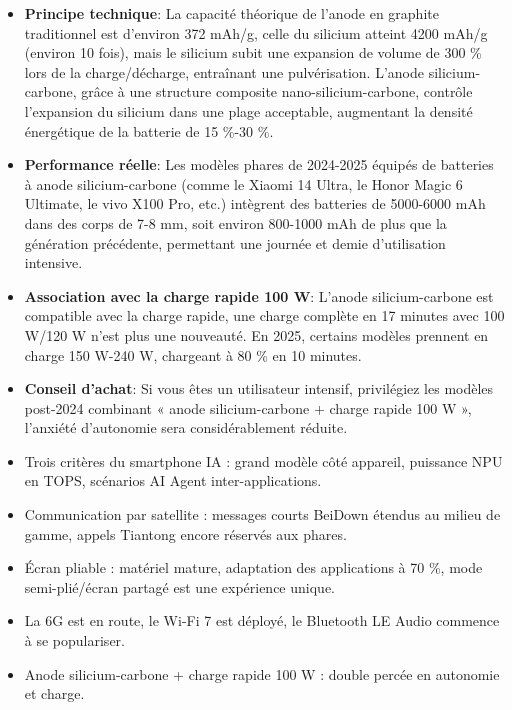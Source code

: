 \begin{itemize}
  \item \textbf{Principe technique}: La capacité théorique de l'anode en graphite traditionnel est d'environ 372 mAh/g, celle du silicium atteint 4200 mAh/g (environ 10 fois), mais le silicium subit une expansion de volume de 300 \% lors de la charge/décharge, entraînant une pulvérisation. L'anode silicium-carbone, grâce à une structure composite nano-silicium-carbone, contrôle l'expansion du silicium dans une plage acceptable, augmentant la densité énergétique de la batterie de 15 \%-30 \%.
  \item \textbf{Performance réelle}: Les modèles phares de 2024-2025 équipés de batteries à anode silicium-carbone (comme le Xiaomi 14 Ultra, le Honor Magic 6 Ultimate, le vivo X100 Pro, etc.) intègrent des batteries de 5000-6000 mAh dans des corps de 7-8 mm, soit environ 800-1000 mAh de plus que la génération précédente, permettant une journée et demie d'utilisation intensive.
  \item \textbf{Association avec la charge rapide 100 W}: L'anode silicium-carbone est compatible avec la charge rapide, une charge complète en 17 minutes avec 100 W/120 W n'est plus une nouveauté. En 2025, certains modèles prennent en charge 150 W-240 W, chargeant à 80 \% en 10 minutes.
  \item \textbf{Conseil d'achat}: Si vous êtes un utilisateur intensif, privilégiez les modèles post-2024 combinant « anode silicium-carbone + charge rapide 100 W », l'anxiété d'autonomie sera considérablement réduite.
\end{itemize}


\begin{itemize}
  \item Trois critères du smartphone IA : grand modèle côté appareil, puissance NPU en TOPS, scénarios AI Agent inter-applications.
  \item Communication par satellite : messages courts BeiDown étendus au milieu de gamme, appels Tiantong encore réservés aux phares.
  \item Écran pliable : matériel mature, adaptation des applications à 70 \%, mode semi-plié/écran partagé est une expérience unique.
  \item La 6G est en route, le Wi-Fi 7 est déployé, le Bluetooth LE Audio commence à se populariser.
  \item Anode silicium-carbone + charge rapide 100 W : double percée en autonomie et charge.
\end{itemize}

